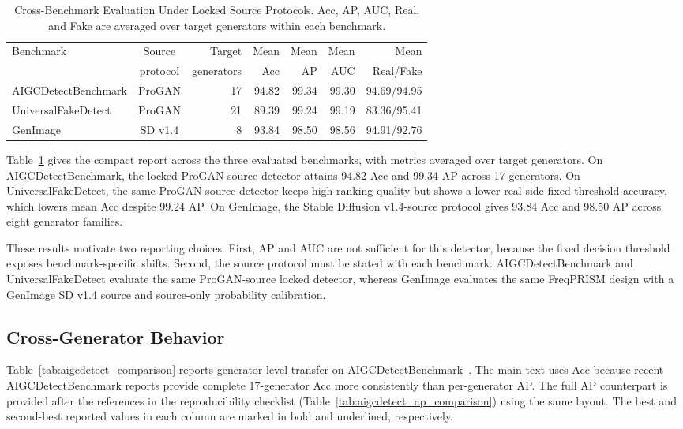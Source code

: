 \documentclass[lettersize,journal]{IEEEtran}
\begin{document}
\begin{table}[t]
\caption{Cross-Benchmark Evaluation Under Locked Source Protocols. Acc, AP, AUC, Real, and Fake are averaged over target generators within each benchmark.}
\label{tab:benchmark_summary}
\centering
\scriptsize
\renewcommand{\arraystretch}{1.08}
\setlength{\tabcolsep}{2.8pt}
\begin{tabular}{@{}lcrrrrr@{}}
\toprule
Benchmark & Source & Target & Mean & Mean & Mean & Mean \\
 & protocol & generators & Acc & AP & AUC & Real/Fake \\
\midrule
AIGCDetectBenchmark & ProGAN & 17 & 94.82 & 99.34 & 99.30 & 94.69/94.95 \\
UniversalFakeDetect & ProGAN & 21 & 89.39 & 99.24 & 99.19 & 83.36/95.41 \\
GenImage & SD v1.4 & 8 & 93.84 & 98.50 & 98.56 & 94.91/92.76 \\
\bottomrule
\end{tabular}
\end{table}

Table~\ref{tab:benchmark_summary} gives the compact report across the three evaluated benchmarks, with metrics averaged over target generators. On AIGCDetectBenchmark, the locked ProGAN-source detector attains 94.82 Acc and 99.34 AP across 17 generators. On UniversalFakeDetect, the same ProGAN-source detector keeps high ranking quality but shows a lower real-side fixed-threshold accuracy, which lowers mean Acc despite 99.24 AP. On GenImage, the Stable Diffusion v1.4-source protocol gives 93.84 Acc and 98.50 AP across eight generator families.

These results motivate two reporting choices. First, AP and AUC are not sufficient for this detector, because the fixed decision threshold exposes benchmark-specific shifts. Second, the source protocol must be stated with each benchmark. AIGCDetectBenchmark and UniversalFakeDetect evaluate the same ProGAN-source locked detector, whereas GenImage evaluates the same FreqPRISM design with a GenImage SD v1.4 source and source-only probability calibration.

\subsection{Cross-Generator Behavior}
\label{sec:cross_generator_behavior}

Table~\ref{tab:aigcdetect_comparison} reports generator-level transfer on AIGCDetectBenchmark~\cite{zhong2023patchcraft}. The main text uses Acc because recent AIGCDetectBenchmark reports provide complete 17-generator Acc more consistently than per-generator AP. The full AP counterpart is provided after the references in the reproducibility checklist (Table~\ref{tab:aigcdetect_ap_comparison}) using the same layout. The best and second-best reported values in each column are marked in bold and underlined, respectively.
\end{document}
